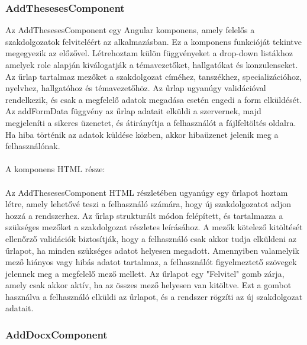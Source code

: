 \subsubsection{AddThesesesComponent}

Az AddThesesesComponent egy Angular komponens, amely felelős a szakdolgozatok felviteléért az alkalmazásban. Ez a komponens funkcióját tekintve megegyezik az előzővel. Létrehoztam külön függvényeket a drop-down listákhoz amelyek role alapján kiválogatják a témavezetőket, hallgatókat és konzulenseket.  Az űrlap tartalmaz mezőket a szakdolgozat címéhez, tanszékhez, specializációhoz, nyelvhez, hallgatóhoz és témavezetőhöz. Az űrlap ugyanúgy validációval rendelkezik, és csak a megfelelő adatok megadása esetén engedi a form elküldését. Az addFormData függvény az űrlap adatait elküldi a szervernek, majd megjeleníti a sikeres üzenetet, és átirányítja a felhasználót a fájlfeltöltés oldalra. Ha hiba történik az adatok küldése közben, akkor hibaüzenet jelenik meg a felhasználónak.\\
\\
A komponens HTML része:\\
\\
Az AddThesesesComponent HTML részletében ugyanúgy egy űrlapot hoztam létre, amely lehetővé teszi a felhasználó számára, hogy új szakdolgozatot adjon hozzá a rendszerhez. Az űrlap strukturált módon felépített, és tartalmazza a szükséges mezőket a szakdolgozat részletes leírásához. A mezők kötelező kitöltését ellenőrző validációk biztosítják, hogy a felhasználó csak akkor tudja elküldeni az űrlapot, ha minden szükséges adatot helyesen megadott. Amennyiben valamelyik mező hiányos vagy hibás adatot tartalmaz, a felhasználót figyelmeztető szövegek jelennek meg a megfelelő mező mellett. Az űrlapot egy "Felvitel" gomb zárja, amely csak akkor aktív, ha az összes mező helyesen van kitöltve. Ezt a gombot használva a felhasználó elküldi az űrlapot, és a rendszer rögzíti az új szakdolgozat adatait.

\subsubsection{AddDocxComponent}

